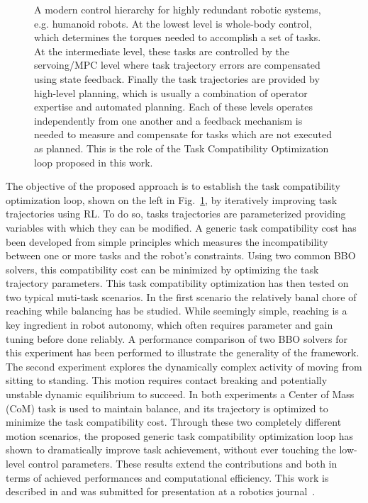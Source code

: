 \begin{figure}[!h]
\begin{minipage}[c]{0.5\textwidth}
\begin{tikzpicture}[node distance=1cm, auto,]
    \end{tikzpicture}
  	\end{minipage}\hfill
  \begin{minipage}[c]{0.47\textwidth}
      \setlength{\belowcaptionskip}{-12pt}
    \caption{A modern control hierarchy for highly redundant robotic systems, e.g. humanoid robots. At the lowest level is whole-body control, which determines the torques needed to accomplish a set of tasks. At the intermediate level, these tasks are controlled by the servoing/MPC level where task trajectory errors are compensated using state feedback. Finally the task trajectories are provided by high-level planning, which is usually a combination of operator expertise and automated planning. Each of these levels operates independently from one another and a feedback mechanism is needed to measure and compensate for tasks which are not executed as planned. This is the role of the Task Compatibility Optimization loop proposed in this work.}
\label{fig:control_diagram}
  \end{minipage}
\end{figure}

The objective of the proposed approach is to establish the task compatibility optimization loop, shown on the left in Fig.~\ref{fig:control_diagram}, by iteratively improving task trajectories using RL. To do so, tasks trajectories are parameterized providing variables with which they can be modified. A generic task compatibility cost has been developed from simple principles which measures the incompatibility between one or more tasks and the robot's constraints. Using two common BBO solvers, this compatibility cost can be minimized by optimizing the task trajectory parameters. This task compatibility optimization has then tested on two typical muti-task scenarios. In the first scenario the relatively banal chore of reaching while balancing has be studied. While seemingly simple, reaching is a key ingredient in robot autonomy, which often requires parameter and gain tuning before done reliably. A performance comparison of two BBO solvers for this experiment has been performed to illustrate the generality of the framework. The second experiment explores the dynamically complex activity of moving from sitting to standing. This motion requires contact breaking and potentially unstable dynamic equilibrium to succeed. In both experiments a Center of Mass (CoM) task is used to maintain balance, and its trajectory is optimized to minimize the task compatibility cost. Through these two completely different motion scenarios, the proposed generic task compatibility optimization loop has shown to dramatically improve task achievement, without ever touching the low-level control parameters. These results extend the contributions \cite{lober-HUMANOIDS2014} and \cite{lober_IROS2015} both in terms of achieved performances and computational efficiency. This work is described in \cite{deliverable33} and was submitted for presentation at a robotics journal~\cite{lober2017RAL-IROS}.

